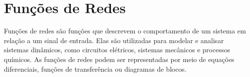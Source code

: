 
\chapter{Funções de Redes}
\label{chap: funcoes de redes}

Funções de redes são funções que descrevem o comportamento de um sistema em relação a um sinal de entrada. Elas são utilizadas para modelar e analisar sistemas dinâmicos, como circuitos elétricos, sistemas mecânicos e processos químicos. As funções de redes podem ser representadas por meio de equações diferenciais, funções de transferência ou diagramas de blocos.

